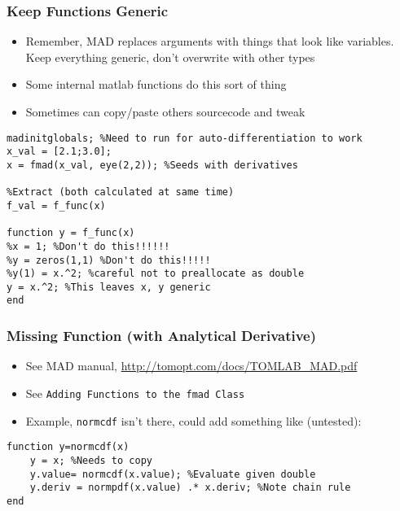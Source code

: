 \documentclass[nofootline]{etk-presentation}
\begin{document}
\begin{frame}[fragile]	\frametitle{Keep Functions Generic}
	\begin{itemize}
		\item Remember, MAD replaces arguments with things that look like variables.  Keep everything generic, don't overwrite with other types
		\item Some internal matlab functions do this sort of thing
		\item Sometimes can copy/paste others sourcecode and tweak
	\end{itemize}

\begin{verbatim}
madinitglobals; %Need to run for auto-differentiation to work
x_val = [2.1;3.0];
x = fmad(x_val, eye(2,2)); %Seeds with derivatives

%Extract (both calculated at same time)
f_val = f_func(x)

function y = f_func(x)
%x = 1; %Don't do this!!!!!!
%y = zeros(1,1) %Don't do this!!!!!
%y(1) = x.^2; %careful not to preallocate as double
y = x.^2; %This leaves x, y generic
end
\end{verbatim}	

 \end{frame}

\begin{frame}[fragile]	\frametitle{Missing Function (with Analytical Derivative)}
\begin{itemize}
	\item See MAD manual, \url{http://tomopt.com/docs/TOMLAB_MAD.pdf}
	\item See \verb!Adding Functions to the fmad Class!
	\item Example, \verb!normcdf! isn't there, could add something like (untested):
\end{itemize}

\begin{verbatim}
function y=normcdf(x)
	y = x; %Needs to copy		
	y.value= normcdf(x.value); %Evaluate given double 
	y.deriv = normpdf(x.value) .* x.deriv; %Note chain rule
end
\end{verbatim}
 \end{frame}
\end{document}
